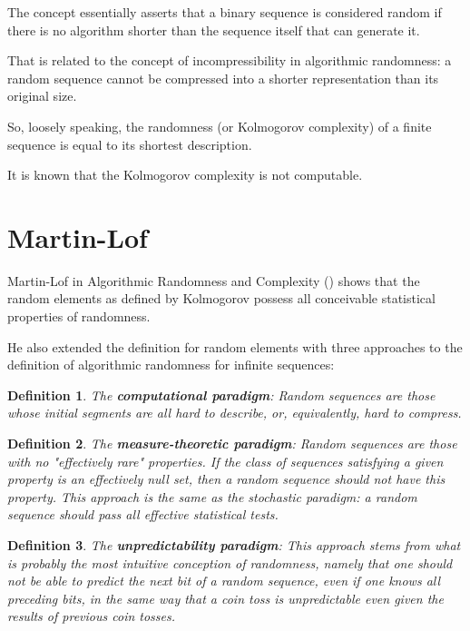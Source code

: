 \documentclass[12pt, a4paper]{report}
\newtheorem{definition}{Definition}[section] %
\begin{document}
The concept essentially asserts that a binary sequence is considered random if there is no algorithm shorter than the sequence
itself that can generate it.

That is related to the concept of incompressibility in algorithmic randomness: a random sequence cannot be compressed into a
shorter representation than its original size.

So, loosely speaking, the randomness (or Kolmogorov complexity) of a finite sequence is equal to its shortest description.

It is known that the Kolmogorov complexity is not computable.

\section{Martin-Lof} %

Martin-Lof in Algorithmic Randomness and Complexity (\cite{TheDefinitionOfRandomSequences}) shows that the random elements as
defined by Kolmogorov possess all conceivable statistical properties of randomness.

He also extended the definition for random elements with three approaches to the definition of algorithmic randomness for infinite
sequences:

\begin{definition}
The \textbf{computational paradigm}: Random sequences are those whose initial segments are all hard  to describe, or,
equivalently, hard to compress.
\end{definition}

\begin{definition}
The \textbf{measure-theoretic paradigm}: Random sequences  are those with no "effectively rare" properties. If the class of
sequences satisfying a given property is an effectively null set, then a random sequence should not have this property.
This approach is the same as the stochastic paradigm: a random sequence should pass all effective statistical tests.
\end{definition}

\begin{definition}
The \textbf{unpredictability paradigm}: This approach stems from what is probably the most intuitive conception of randomness,
namely that one should not be able to predict the next bit of a random sequence, even if one knows all preceding bits, in the same
way that a coin toss is unpredictable even given the results of previous coin tosses.
\end{definition}
\end{document}
